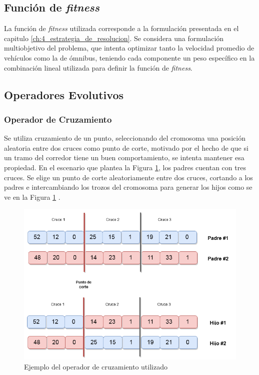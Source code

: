 \subsection{Función de \emph{fitness}}

La función de \emph{fitness} utilizada corresponde a la formulación presentada en el capitulo \ref{ch:4_estrategia_de_resolucion}. Se considera una formulación multiobjetivo del problema, que intenta optimizar tanto la velocidad promedio de vehículos como la de ómnibus, teniendo cada componente un peso específico en la combinación lineal utilizada para definir la función de \emph{fitness}. 

\subsection{Operadores Evolutivos}

\subsubsection{Operador de Cruzamiento}
Se utiliza cruzamiento de un punto, seleccionando del cromosoma una posición aleatoria entre dos cruces como punto de corte, motivado por el hecho de que si un tramo del corredor tiene un buen comportamiento, se intenta mantener esa propiedad. En el escenario que plantea la Figura \ref{fig:op_cruzamiento}, los padres cuentan con tres cruces. Se elige un punto de corte aleatoriamente entre dos cruces, cortando a los padres e intercambiando los trozos del cromosoma para generar los hijos como se ve en la Figura \ref{fig:op_cruzamiento} .


\begin{figure}[H]
	\centering
	\includegraphics[width=0.8\linewidth]{Figures/alg_cruzamiento}
	\caption{Ejemplo del operador de cruzamiento utilizado}
	\label{fig:op_cruzamiento}
\end{figure}



